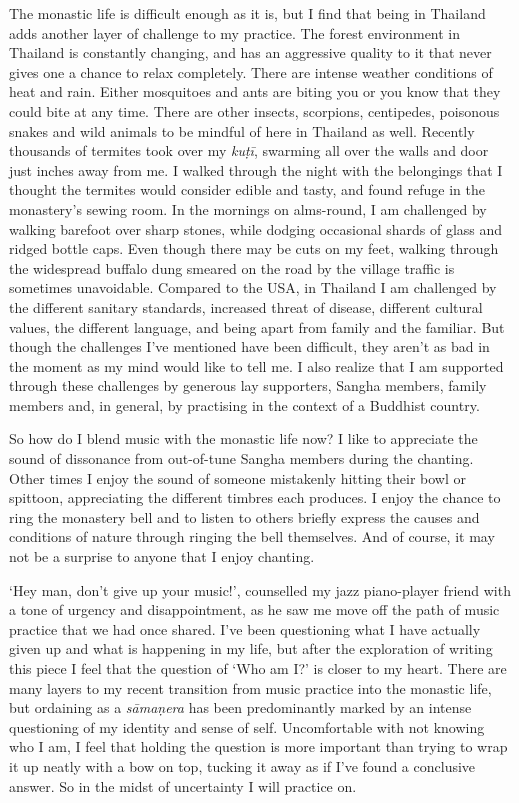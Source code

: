 The monastic life is difficult enough as it is, but I find that being in
Thailand adds another layer of challenge to my practice. The forest
environment in Thailand is constantly changing, and has an aggressive
quality to it that never gives one a chance to relax completely. There
are intense weather conditions of heat and rain. Either mosquitoes and
ants are biting you or you know that they could bite at any time. There
are other insects, scorpions, centipedes, poisonous snakes and wild
animals to be mindful of here in Thailand as well. Recently thousands of
termites took over my \emph{kuṭī}, swarming all over the walls and door
just inches away from me. I walked through the night with the belongings
that I thought the termites would consider edible and tasty, and found
refuge in the monastery's sewing room. In the mornings on alms-round, I
am challenged by walking barefoot over sharp stones, while dodging
occasional shards of glass and ridged bottle caps. Even though there may
be cuts on my feet, walking through the widespread buffalo dung smeared
on the road by the village traffic is sometimes unavoidable. Compared to
the USA, in Thailand I am challenged by the different sanitary
standards, increased threat of disease, different cultural values, the
different language, and being apart from family and the familiar. But
though the challenges I've mentioned have been difficult, they aren't as
bad in the moment as my mind would like to tell me. I also realize that
I am supported through these challenges by generous lay supporters, 
Sangha members, family members and, in general, by practising in the
context of a Buddhist country. 

So how do I blend music with the monastic life now? I like to appreciate
the sound of dissonance from out-of-tune Sangha members during the
chanting. Other times I enjoy the sound of someone mistakenly hitting
their bowl or spittoon, appreciating the different timbres each
produces. I enjoy the chance to ring the monastery bell and to listen to
others briefly express the causes and conditions of nature through
ringing the bell themselves. And of course, it may not be a surprise to
anyone that I enjoy chanting. 

`Hey man, don't give up your music!', counselled my jazz piano-player
friend with a tone of urgency and disappointment, as he saw me move off
the path of music practice that we had once shared. I've been
questioning what I have actually given up and what is happening in my
life, but after the exploration of writing this piece I feel that the
question of `Who am I?' is closer to my heart. There are many layers to
my recent transition from music practice into the monastic life, but
ordaining as a \emph{sāmaṇera} has been predominantly marked by an
intense questioning of my identity and sense of self. Uncomfortable with
not knowing who I am, I feel that holding the question is more important
than trying to wrap it up neatly with a bow on top, tucking it away as
if I've found a conclusive answer. So in the midst of uncertainty I will
practice on. 

